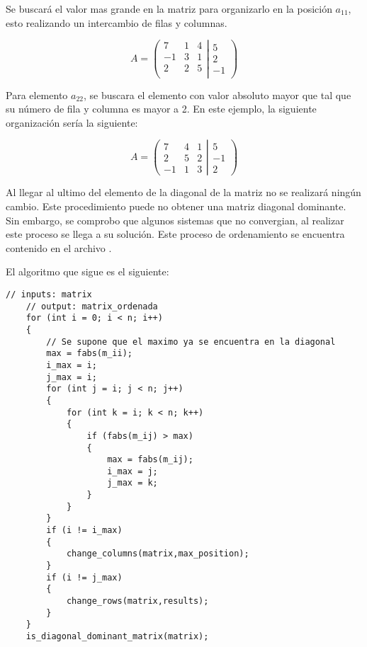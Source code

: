 Se buscará el valor mas grande en la matriz para organizarlo en la posición $a_{11}$, esto realizando un intercambio de filas y columnas.

\begin{equation*}
    A = \left(\left.
    \begin{matrix}
        7  & 1 & 4 \\
        -1 & 3 & 1 \\
        2  & 2 & 5 \\
    \end{matrix}
    \right|
    \begin{matrix}
        5 \\
        2 \\
        -1
    \end{matrix}
    \right)
\end{equation*}

Para elemento $a_{22}$, se buscara el elemento con valor absoluto mayor que tal que su número de fila y columna es mayor a 2. En este ejemplo, la siguiente organización sería la siguiente:

\begin{equation*}
    A = \left(\left.
    \begin{matrix}
        7  & 4 & 1 \\
        2  & 5 & 2 \\
        -1 & 1 & 3
    \end{matrix}
    \right|
    \begin{matrix}
        5  \\
        -1 \\
        2
    \end{matrix}
    \right)
\end{equation*}

Al llegar al ultimo del elemento de la diagonal de la matriz no se realizará ningún cambio. Este procedimiento puede no obtener una matriz diagonal dominante. Sin embargo, se comprobo que algunos sistemas que no convergian, al realizar este proceso se llega a su solución. Este proceso de ordenamiento se encuentra contenido en el archivo .

El algoritmo que sigue es el siguiente:

\begin{lstlisting}[style=CStyle]
    // inputs: matrix
    // output: matrix_ordenada
    for (int i = 0; i < n; i++)
    {
        // Se supone que el maximo ya se encuentra en la diagonal
        max = fabs(m_ii);
        i_max = i;
        j_max = i;
        for (int j = i; j < n; j++)
        {
            for (int k = i; k < n; k++)
            {
                if (fabs(m_ij) > max)
                {
                    max = fabs(m_ij);
                    i_max = j;
                    j_max = k;
                }
            }
        }
        if (i != i_max)
        {
            change_columns(matrix,max_position);
        }
        if (i != j_max)
        {
            change_rows(matrix,results);
        }
    }
    is_diagonal_dominant_matrix(matrix);
\end{lstlisting}